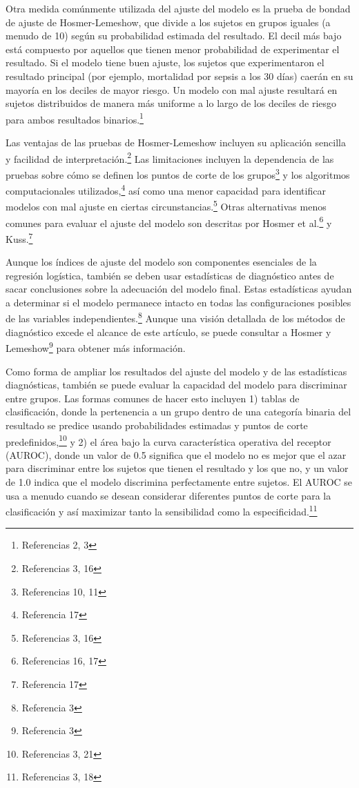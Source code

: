 \documentclass[12pt]{article}
\begin{document}
Otra medida com\'unmente utilizada del ajuste del modelo es la prueba de bondad de ajuste de Hosmer-Lemeshow, que divide a los sujetos en grupos iguales (a menudo de 10) seg\'un su probabilidad estimada del resultado. El decil m\'as bajo est\'a compuesto por aquellos que tienen menor probabilidad de experimentar el resultado. Si el modelo tiene buen ajuste, los sujetos que experimentaron el resultado principal (por ejemplo, mortalidad por sepsis a los 30 d\'ias) caer\'an en su mayor\'ia en los deciles de mayor riesgo. Un modelo con mal ajuste resultar\'a en sujetos distribuidos de manera m\'as uniforme a lo largo de los deciles de riesgo para ambos resultados binarios.\footnote{Referencias 2, 3}

Las ventajas de las pruebas de Hosmer-Lemeshow incluyen su aplicaci\'on sencilla y facilidad de interpretaci\'on.\footnote{Referencias 3, 16} Las limitaciones incluyen la dependencia de las pruebas sobre c\'omo se definen los puntos de corte de los grupos\footnote{Referencias 10, 11} y los algoritmos computacionales utilizados,\footnote{Referencia 17} as\'i como una menor capacidad para identificar modelos con mal ajuste en ciertas circunstancias.\footnote{Referencias 3, 16} Otras alternativas menos comunes para evaluar el ajuste del modelo son descritas por Hosmer et al.\footnote{Referencias 16, 17} y Kuss.\footnote{Referencia 17}

Aunque los \'indices de ajuste del modelo son componentes esenciales de la regresi\'on log\'istica, tambi\'en se deben usar estad\'isticas de diagn\'ostico antes de sacar conclusiones sobre la adecuaci\'on del modelo final. Estas estad\'isticas ayudan a determinar si el modelo permanece intacto en todas las configuraciones posibles de las variables independientes.\footnote{Referencia 3} Aunque una visi\'on detallada de los m\'etodos de diagn\'ostico excede el alcance de este art\'iculo, se puede consultar a Hosmer y Lemeshow\footnote{Referencia 3} para obtener m\'as informaci\'on.

Como forma de ampliar los resultados del ajuste del modelo y de las estad\'isticas diagn\'osticas, tambi\'en se puede evaluar la capacidad del modelo para discriminar entre grupos. Las formas comunes de hacer esto incluyen 1) tablas de clasificaci\'on, donde la pertenencia a un grupo dentro de una categor\'ia binaria del resultado se predice usando probabilidades estimadas y puntos de corte predefinidos,\footnote{Referencias 3, 21} y 2) el \'area bajo la curva caracter\'istica operativa del receptor (AUROC), donde un valor de 0.5 significa que el modelo no es mejor que el azar para discriminar entre los sujetos que tienen el resultado y los que no, y un valor de 1.0 indica que el modelo discrimina perfectamente entre sujetos. El AUROC se usa a menudo cuando se desean considerar diferentes puntos de corte para la clasificaci\'on y as\'i maximizar tanto la sensibilidad como la especificidad.\footnote{Referencias 3, 18}
\end{document}
